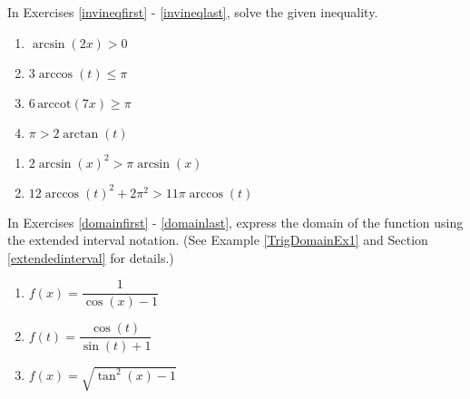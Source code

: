 \documentclass{ximera}
\begin{document}
In Exercises \ref{invineqfirst} - \ref{invineqlast}, solve the given inequality.

\begin{multicols}{4}

\begin{enumerate}

\setcounter{enumi}{\value{HW}}

\item $\arcsin(2x) > 0$ \label{invineqfirst}  
\item $3 \arccos(t) \leq \pi$
\item $6 \, \text{arccot}(7x) \geq \pi$  
\item $\pi > 2\arctan(t)$ 

\setcounter{HW}{\value{enumi}}

\end{enumerate}

\end{multicols}

\begin{multicols}{2}

\begin{enumerate}

\setcounter{enumi}{\value{HW}}

\item $2\arcsin(x)^2 > \pi \arcsin(x)$  
\item $12 \arccos(t)^2+2\pi^2>11\pi \arccos(t)$ \label{invineqlast} 

\setcounter{HW}{\value{enumi}}

\end{enumerate}

\end{multicols}

In Exercises \ref{domainfirst} - \ref{domainlast}, express the domain of the function using the extended interval notation. (See Example \ref{TrigDomainEx1} and Section \ref{extendedinterval} for details.)

\begin{multicols}{3}

\begin{enumerate}

\setcounter{enumi}{\value{HW}}

\item $f(x) = \dfrac{1}{\cos(x) - 1}$  \label{domainfirst}
\item $f(t) = \dfrac{\cos(t)}{\sin(t) + 1}$
\item $f(x) = \sqrt{\tan^{2}(x) - 1}$ 

\setcounter{HW}{\value{enumi}}

\end{enumerate}

\end{multicols}
\end{document}
